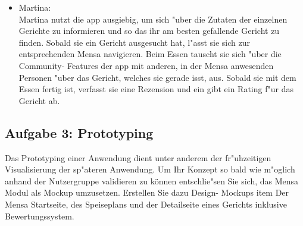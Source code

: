 \begin {enumerate}
\begin{itemize}
        \item Martina: \\
            Martina nutzt die app ausgiebig, um sich "uber die Zutaten der einzelnen Gerichte zu informieren und so das ihr am besten gefallende Gericht zu finden. 
            Sobald sie ein Gericht ausgesucht hat, l"asst sie sich zur entsprechenden Mensa navigieren.
            Beim Essen tauscht sie sich "uber die Community- Features der app mit anderen, in der Mensa anwesenden Personen "uber das Gericht, welches sie gerade isst, aus.
            Sobald sie mit dem Essen fertig ist, verfasst sie eine Rezension und ein gibt ein Rating f"ur das Gericht ab.
    \end{itemize}
\end {enumerate}

\subsection{Aufgabe 3: Prototyping  }
Das  Prototyping  einer  Anwendung  dient  unter  anderem  der  fr"uhzeitigen  Visualisierung  der sp"ateren Anwendung. 
Um Ihr Konzept so bald wie m"oglich anhand der Nutzergruppe validieren zu können entschlie"sen Sie sich, das Mensa Modul als Mockup umzusetzen.  
Erstellen  Sie  dazu  Design- Mockups item Der  Mensa  Startseite, des Speiseplans und der Detailseite eines Gerichts inklusive Bewertungssystem.

